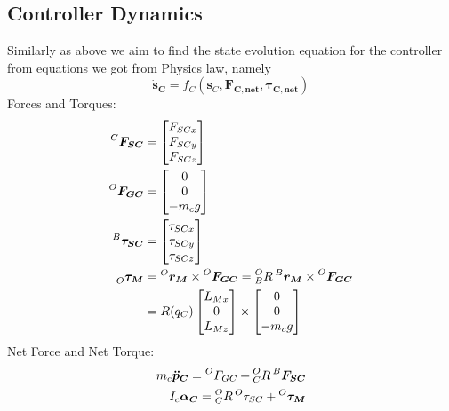 \subsection{Controller Dynamics}
Similarly as above we aim to find the state evolution equation for the controller from equations we got from Physics law, namely
\begin{equation}
  \bm{\dot{s}_C} = f_C(\bm{s}_C, \bm{F_{C, net}}, \bm{\tau_{C, net}})
\end{equation}
Forces and Torques:
\begin{align*}
  \prescript{C}{}{\bm{F_{SC}}} &=
  \begin{bmatrix}
    F_{SCx} \\ F_{SCy} \\ F_{SCz}
  \end{bmatrix} \\
  \prescript{O}{}{\bm{F_{GC}}} &=
  \begin{bmatrix}
    0 \\ 0 \\ -m_c g
  \end{bmatrix} \\
  \prescript{B}{}{\bm{\tau_{SC}}} &=
  \begin{bmatrix}
    \tau_{SCx} \\ \tau_{SCy} \\ \tau_{SCz} 
  \end{bmatrix} \\
  \prescript{}{O}{\bm{\tau_{M}}} &= \prescript{O}{}{\bm{r_M}} \times \prescript{O}{}{\bm{F_{GC}}} = \prescript{O}{B}{R} \prescript{B}{}{\bm{r_M}} \times \prescript{O}{}{\bm{F_{GC}}} \\
                               &= R(q_C) 
                                 \begin{bmatrix}
                                   L_{Mx} \\ 0 \\ L_{Mz}
                                 \end{bmatrix} \times
  \begin{bmatrix}
    0 \\ 0 \\ -m_c g
  \end{bmatrix}
\end{align*}
Net Force and Net Torque:
\begin{align*}
  m_c \bm{\ddot{p}_C} = \prescript{O}{}{F_{GC}} + \prescript{O}{C}{R} \prescript{B}{}{\bm{F_{SC}}} \\
  I_c \bm{\alpha_C} = \prescript{O}{C}{R} \prescript{O}{}{\tau_{SC}} + \prescript{O}{}{\bm{\tau_{M}}} 
\end{align*}

